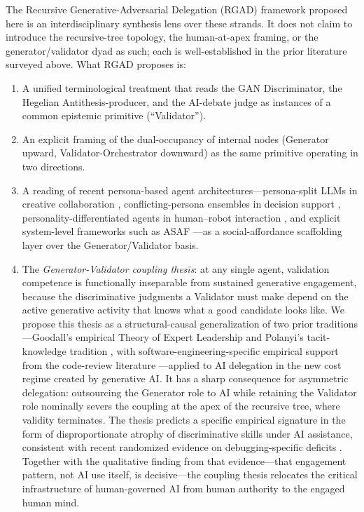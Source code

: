 \documentclass[11pt,a4paper]{article}
\begin{document}
The Recursive Generative-Adversarial Delegation (RGAD) framework proposed here is an interdisciplinary synthesis lens over these strands. It does not claim to introduce the recursive-tree topology, the human-at-apex framing, or the generator/validator dyad as such; each is well-established in the prior literature surveyed above. What RGAD proposes is:

\begin{enumerate}
\item[(i)] A unified terminological treatment that reads the GAN Discriminator, the Hegelian Antithesis-producer, and the AI-debate judge as instances of a common epistemic primitive (``Validator'').
\item[(ii)] An explicit framing of the dual-occupancy of internal nodes (Generator upward, Validator-Orchestrator downward) as the same primitive operating in two directions.
\item[(iii)] A reading of recent persona-based agent architectures---persona-split LLMs in creative collaboration \citep{epperson2025}, conflicting-persona ensembles in decision support \citep{kumar2025}, personality-differentiated agents in human--robot interaction \citep{alami2026}, and explicit system-level frameworks such as ASAF \citep{lee2026}---as a social-affordance scaffolding layer over the Generator/Validator basis.
\item[(iv)] The \emph{Generator-Validator coupling thesis}: at any single agent, validation competence is functionally inseparable from sustained generative engagement, because the discriminative judgments a Validator must make depend on the active generative activity that knows what a good candidate looks like. We propose this thesis as a structural-causal generalization of two prior traditions---Goodall's empirical Theory of Expert Leadership \citep{goodall2011} and Polanyi's tacit-knowledge tradition \citep{polanyi1966}, with software-engineering-specific empirical support from the code-review literature \citep{bacchelli2013}---applied to AI delegation in the new cost regime created by generative AI. It has a sharp consequence for asymmetric delegation: outsourcing the Generator role to AI while retaining the Validator role nominally severs the coupling at the apex of the recursive tree, where validity terminates. The thesis predicts a specific empirical signature in the form of disproportionate atrophy of discriminative skills under AI assistance, consistent with recent randomized evidence on debugging-specific deficits \citep{shen2026}. Together with the qualitative finding from that evidence---that engagement pattern, not AI use itself, is decisive---the coupling thesis relocates the critical infrastructure of human-governed AI from human authority to the engaged human mind.
\end{enumerate}
\end{document}
